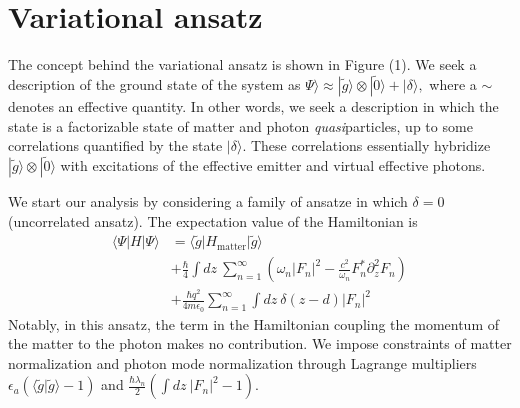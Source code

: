 \documentclass[aps,prb,twocolumn,
	groupedaddress,superscriptaddress,
	amsfonts,amssymb,amsmath,floatfix,
	citeautoscript]{revtex4-1}
\begin{document}
\section{Variational ansatz}

The concept behind the variational ansatz is shown in Figure (1). We seek a description of the ground state of the system as $\Psi\rangle \approx |\tilde{g}\rangle\otimes|\tilde{0}\rangle + |\delta\rangle,$ where a $\sim$ denotes an effective quantity. In other words, we seek a description in which the state is a factorizable state of matter and photon \textit{quasi}particles, up to some correlations quantified by the state $|\delta\rangle$. These correlations essentially hybridize $|\tilde{g}\rangle\otimes|\tilde{0}\rangle$ with excitations of the effective emitter and virtual effective photons. 

We start our analysis by considering a family of ansatze in which $\delta = 0$ (uncorrelated ansatz).  The expectation value of the Hamiltonian is 
\begin{align}
\langle \Psi | H | \Psi \rangle &= \langle \tilde{g} |H_{\text{matter}} | \tilde{g}\rangle \nonumber \\ &+ \frac{\hbar}{4}\int dz ~\sum\limits_{n=1}^{\infty}\left(\omega_n|F_n|^2 - \frac{c^2}{\omega_n}F_n^*\partial_z^2F_n\right) \nonumber \\ &+ \frac{\hbar q^2}{4m\epsilon_0}\sum\limits_{n=1}^{\infty} \int dz~\delta(z-d)|F_n|^2
\end{align}
Notably, in this ansatz, the term in the Hamiltonian coupling the momentum of the matter to the photon makes no contribution. We impose constraints of matter normalization and photon mode normalization through Lagrange multipliers $\epsilon_a(\langle \tilde{g}|\tilde{g}\rangle-1)$ and $\frac{\hbar\lambda_n}{2}\left( \int dz~|F_n|^2-1\right)$.
\end{document}
